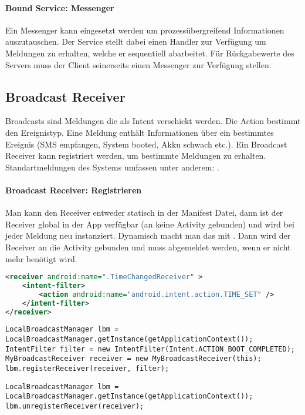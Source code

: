 \paragraph{Bound Service: Messenger} Ein Messenger kann eingesetzt werden um prozessübergreifend Informationen auszutauschen. Der Service stellt dabei einen Handler zur Verfügung um Meldungen zu erhalten, welche er sequentiell abarbeitet. Für Rückgabewerte des Servers muss der Client seinerseits einen Messenger zur Verfügung stellen.
\subsection{Broadcast Receiver} Broadcasts sind Meldungen die als Intent verschickt werden. Die Action bestimmt den Ereignistyp. Eine Meldung enthält Informationen über ein bestimmtes Ereignis (SMS empfangen, System booted, Akku schwach etc.). Ein Broadcast Receiver kann registriert werden, um bestimmte Meldungen zu erhalten. Standartmeldungen des Systems umfassen unter anderem: .
\paragraph{Broadcast Receiver: Registrieren} Man kann den Receiver entweder statisch in der Manifest Datei, dann ist der Receiver global in der App verfügbar (an keine Activity gebunden) und wird bei jeder Meldung neu instanziert. Dynamisch macht man das mit . Dann wird der Receiver an die Activity gebunden und muss abgemeldet werden, wenn er nicht mehr benötigt wird.
\begin{lstlisting}[language=xml, caption="{}Statische Registration"]
<receiver android:name=".TimeChangedReceiver" >
    <intent-filter>
        <action android:name="android.intent.action.TIME_SET" />
    </intent-filter>
</receiver>
\end{lstlisting}
\begin{lstlisting}[caption="Dynamische Registration"]
LocalBroadcastManager lbm = LocalBroadcastManager.getInstance(getApplicationContext());
IntentFilter filter = new IntentFilter(Intent.ACTION_BOOT_COMPLETED);
MyBroadcastReceiver receiver = new MyBroadcastReceiver(this);
lbm.registerReceiver(receiver, filter);
\end{lstlisting}
\begin{lstlisting}[caption="Receiver abmelden"]
LocalBroadcastManager lbm = LocalBroadcastManager.getInstance(getApplicationContext());
lbm.unregisterReceiver(receiver);
\end{lstlisting}
